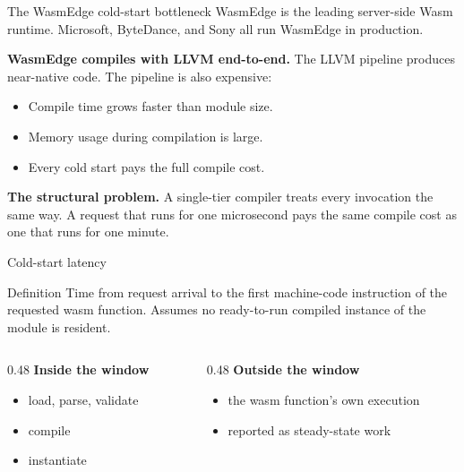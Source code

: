 \documentclass[aspectratio=169,11pt]{beamer}
\begin{document}
\begin{frame}{The WasmEdge cold-start bottleneck}
  WasmEdge is the leading server-side Wasm runtime.
  Microsoft, ByteDance, and Sony all run WasmEdge in production.

  \vspace{0.4em}
  \textbf{WasmEdge compiles with LLVM end-to-end.}
  The LLVM pipeline produces near-native code.
  The pipeline is also expensive:
  \begin{itemize}\setlength{\itemsep}{2pt}
    \item Compile time grows faster than module size.
    \item Memory usage during compilation is large.
    \item Every cold start pays the full compile cost.
  \end{itemize}

  \vspace{0.4em}
  \textbf{The structural problem.}
  A single-tier compiler treats every invocation the same way.
  A request that runs for one microsecond pays the same compile cost as one that runs for one minute.

\end{frame}

\begin{frame}{Cold-start latency}
  \begin{block}{Definition}
    Time from request arrival to the first machine-code instruction of the requested wasm function. Assumes no ready-to-run compiled instance of the module is resident.
  \end{block}

  \vspace{0.3em}
  \begin{columns}[T,onlytextwidth]
    \begin{column}{0.48\textwidth}
      \textbf{Inside the window}
      \begin{itemize}\setlength{\itemsep}{1pt}
        \item load, parse, validate
        \item compile
        \item instantiate
      \end{itemize}
    \end{column}
    \begin{column}{0.48\textwidth}
      \textbf{Outside the window}
      \begin{itemize}\setlength{\itemsep}{1pt}
        \item the wasm function's own execution
        \item reported as steady-state work
      \end{itemize}
    \end{column}
  \end{columns}

\end{frame}
\end{document}
